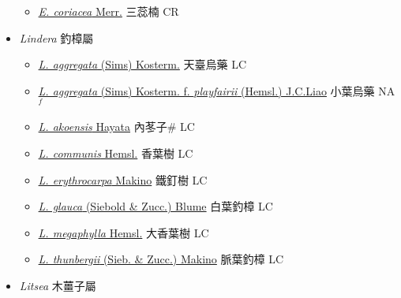 \begin{itemize}
  \begin{itemize}
        \item[] \href{http://www.theplantlist.org/tpl1.1/search?q=Endiandra+coriacea}{\textit{E. coriacea} Merr.}   三蕊楠 CR
  \end{itemize}
 \item[] \textit{Lindera} 釣樟屬
                    
  \begin{itemize}
        \item[] \href{http://www.theplantlist.org/tpl1.1/search?q=Lindera+aggregata}{\textit{L. aggregata} (Sims) Kosterm.}   天臺烏藥 LC
        \item[] \href{http://www.theplantlist.org/tpl1.1/search?q=Lindera+aggregata+ f. +playfairii}{\textit{L. aggregata} (Sims) Kosterm.  f.  \textit{playfairii} (Hemsl.) J.C.Liao}   小葉烏藥 NA$^f$
        \item[] \href{http://www.theplantlist.org/tpl1.1/search?q=Lindera+akoensis}{\textit{L. akoensis} Hayata}   內苳子\# LC
        \item[] \href{http://www.theplantlist.org/tpl1.1/search?q=Lindera+communis}{\textit{L. communis} Hemsl.}   香葉樹 LC
        \item[] \href{http://www.theplantlist.org/tpl1.1/search?q=Lindera+erythrocarpa}{\textit{L. erythrocarpa} Makino}   鐵釘樹 LC
        \item[] \href{http://www.theplantlist.org/tpl1.1/search?q=Lindera+glauca}{\textit{L. glauca} (Siebold \& Zucc.) Blume}   白葉釣樟 LC
        \item[] \href{http://www.theplantlist.org/tpl1.1/search?q=Lindera+megaphylla}{\textit{L. megaphylla} Hemsl.}   大香葉樹 LC
        \item[] \href{http://www.theplantlist.org/tpl1.1/search?q=Lindera+thunbergii}{\textit{L. thunbergii} (Sieb. \& Zucc.) Makino}   脈葉釣樟 LC
  \end{itemize}
 \item[] \textit{Litsea} 木薑子屬
                    

\end{itemize}
